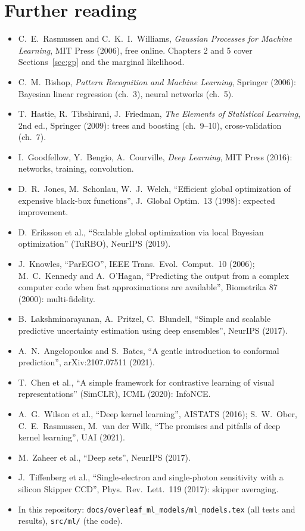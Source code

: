 \documentclass[11pt]{article}
\newcommand{\code}[1]{\texttt{#1}}
\begin{document}
\section{Further reading}
\begin{itemize}\small
\item C.~E.~Rasmussen and C.~K.~I.~Williams, \emph{Gaussian Processes for Machine Learning}, MIT Press (2006), free online. Chapters 2 and
  5 cover Sections~\ref{sec:gp} and the marginal likelihood.
\item C.~M.~Bishop, \emph{Pattern Recognition and Machine Learning}, Springer (2006): Bayesian linear regression (ch.~3), neural
  networks (ch.~5).
\item T.~Hastie, R.~Tibshirani, J.~Friedman, \emph{The Elements of Statistical Learning}, 2nd ed., Springer (2009): trees and
  boosting (ch.~9--10), cross-validation (ch.~7).
\item I.~Goodfellow, Y.~Bengio, A.~Courville, \emph{Deep Learning}, MIT Press (2016): networks, training, convolution.
\item D.~R.~Jones, M.~Schonlau, W.~J.~Welch, ``Efficient global optimization of expensive black-box functions'', J.~Global
  Optim.\ 13 (1998): expected improvement.
\item D.~Eriksson et al., ``Scalable global optimization via local Bayesian optimization'' (TuRBO), NeurIPS (2019).
\item J.~Knowles, ``ParEGO'', IEEE Trans.\ Evol.\ Comput.\ 10 (2006); M.~C.~Kennedy and A.~O'Hagan, ``Predicting the output from a
  complex computer code when fast approximations are available'', Biometrika 87 (2000): multi-fidelity.
\item B.~Lakshminarayanan, A.~Pritzel, C.~Blundell, ``Simple and scalable predictive uncertainty estimation using deep ensembles'',
  NeurIPS (2017).
\item A.~N.~Angelopoulos and S.~Bates, ``A gentle introduction to conformal prediction'', arXiv:2107.07511 (2021).
\item T.~Chen et al., ``A simple framework for contrastive learning of visual representations'' (SimCLR), ICML (2020): InfoNCE.
\item A.~G.~Wilson et al., ``Deep kernel learning'', AISTATS (2016); S.~W.~Ober, C.~E.~Rasmussen, M.~van der Wilk, ``The promises and
  pitfalls of deep kernel learning'', UAI (2021).
\item M.~Zaheer et al., ``Deep sets'', NeurIPS (2017).
\item J.~Tiffenberg et al., ``Single-electron and single-photon sensitivity with a silicon Skipper CCD'', Phys.\ Rev.\ Lett.\ 119
  (2017): skipper averaging.
\item In this repository: \code{docs/overleaf\_ml\_models/ml\_models.tex} (all tests and results), \code{src/ml/} (the code).
\end{itemize}
\end{document}
